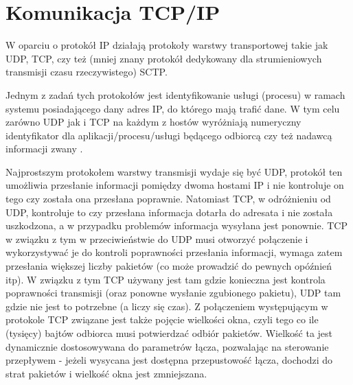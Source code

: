 % 
% 
% 
% 

\section{Komunikacja TCP/IP}

W oparciu o protokół IP działają protokoły warstwy transportowej takie jak UDP, TCP, czy też (mniej znany protokół dedykowany dla  strumieniowych transmisji czasu rzeczywistego) SCTP.

Jednym z zadań tych protokołów jest identyfikowanie usługi (procesu) w ramach systemu posiadającego dany adres IP, do którego mają trafić dane.
W tym celu zarówno UDP jak i TCP na każdym z hostów wyróżniają numeryczny identyfikator dla aplikacji/procesu/usługi będącego odbiorcą czy też nadawcą informacji zwany .

Najprostszym protokołem warstwy transmisji wydaje się być UDP, protokół ten umożliwia przesłanie informacji pomiędzy dwoma hostami IP i nie kontroluje on tego czy została ona przesłana poprawnie.
Natomiast TCP, w odróżnieniu od UDP, kontroluje to czy przesłana informacja dotarła do adresata i nie została uszkodzona, a w przypadku problemów informacja wysyłana jest ponownie. TCP w związku z tym w przeciwieństwie do UDP musi otworzyć połączenie i wykorzystywać je do kontroli poprawności przesłania informacji, wymaga zatem przesłania większej liczby pakietów (co może prowadzić do pewnych opóźnień itp).
W związku z tym TCP używany jest tam gdzie konieczna jest kontrola poprawności transmisji (oraz ponowne wysłanie zgubionego pakietu), UDP tam gdzie nie jest to potrzebne (a liczy się czas).
Z połączeniem występującym w protokole TCP związane jest także pojęcie wielkości okna, czyli tego co ile (tysięcy) bajtów odbiorca musi potwierdzać odbiór pakietów. Wielkość ta jest dynamicznie dostosowywana do parametrów łącza, pozwalając na sterowanie przepływem - jeżeli wysycana jest dostępna przepustowość łącza, dochodzi do strat pakietów i wielkość okna jest zmniejszana.

